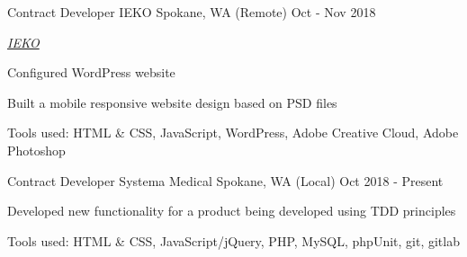 

\begin{cventries}

  \cventry
    {Contract Developer} %
    {IEKO} %
    {Spokane, WA (Remote)} %
    {Oct - Nov 2018} %
    {
      \begin{cvitems} %
        \item {\emph{\href{https://iekoworld.com/}{IEKO}}}
        \item {Configured WordPress website}
        \item {Built a mobile responsive website design based on PSD files}
        \item {Tools used: HTML \& CSS, JavaScript, WordPress, Adobe Creative Cloud, Adobe Photoshop}
      \end{cvitems}
    }

  \cventry
    {Contract Developer} %
    {Systema Medical} %
    {Spokane, WA (Local)} %
    {Oct 2018 - Present} %
    {
      \begin{cvitems} %
        \item {Developed new functionality for a product being developed using TDD principles}
        \item {Tools used: HTML \& CSS, JavaScript/jQuery, PHP, MySQL, phpUnit, git, gitlab}
      \end{cvitems}
    }


\end{cventries}
